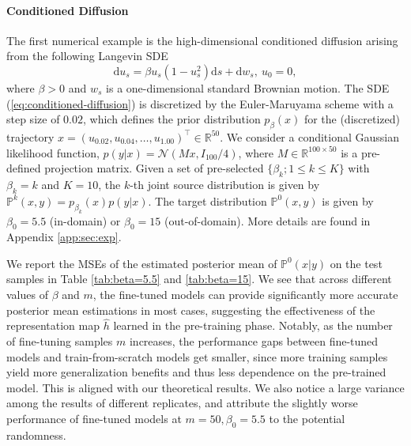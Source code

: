 \documentclass{article}
\numberwithin{equation}{section}
\def\eqref#1{equation~\ref{#1}}
\theoremstyle{definition}
\renewcommand{\eqref}[1]{(\ref{#1})}
\begin{document}
\paragraph{Conditioned Diffusion}
The first numerical example is the high-dimensional conditioned diffusion \citep{cui2016dimension, yu2023hierarchical} arising from the following Langevin SDE
\begin{equation}\label{eq:conditioned-diffusion}
\mathrm{d} u_s = \beta u_s(1-u_s^2) \mathrm{d} s + \mathrm{d} w_s, \ u_0=0,
\end{equation}
where $\beta >0$ and $w_s$ is a one-dimensional standard Brownian motion.
The SDE \eqref{eq:conditioned-diffusion} is discretized by the Euler-Maruyama scheme with a step size of $0.02$, which defines the prior distribution $p_{\beta}(x)$ for the (discretized) trajectory $x=\left(u_{0.02}, u_{0.04}, \ldots, u_{1.00}\right)^\top\in \mathbb{R}^{50}$.
We consider a conditional Gaussian likelihood function, $p(y|x)=\mathcal{N}(Mx, I_{100}/4)$, where $M\in \mathbb{R}^{100\times 50}$ is a pre-defined projection matrix.
Given a set of pre-selected $\{\beta_k; 1\leq k\leq K\}$ with $\beta_k=k$ and $K=10$, the $k$-th joint source distribution is given by $\mathbb{P}^k(x,y)=p_{\beta_k}(x)p(y|x)$.
The target distribution $\mathbb{P}^0(x,y)$ is given by $\beta_0=5.5$ (in-domain) or $\beta_0=15$ (out-of-domain). More details are found in Appendix \ref{app:sec:exp}.



We report the MSEs of the estimated posterior mean of $\mathbb{P}^0(x|y)$ on the test samples in Table \ref{tab:beta=5.5} and \ref{tab:beta=15}.
We see that across different values of $\beta$ and $m$, the fine-tuned models can provide significantly more accurate posterior mean estimations in most cases, suggesting the effectiveness of the representation map $\widehat{h}$ learned in the pre-training phase.
Notably, as the number of fine-tuning samples $m$ increases, the performance gaps between fine-tuned models and train-from-scratch models get smaller, since more training samples yield more generalization benefits and thus less dependence on the pre-trained model.
This is aligned with our theoretical results.
We also notice a large variance among the results of different replicates, and attribute the slightly worse performance of fine-tuned models at $m=50,\beta_0=5.5$ to the potential randomness.
\end{document}
